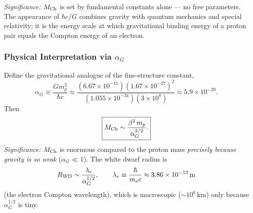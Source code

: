 \textit{Significance:} $M_{\rm Ch}$ is set by fundamental constants alone ---
no free parameters. The appearance of $\hbar c/G$ combines gravity with quantum
mechanics and special relativity; it is the energy scale at which gravitational
binding energy of a proton pair equals the Compton energy of an electron.

\subsubsection*{Physical Interpretation via $\alpha_G$}

Define the gravitational analogue of the fine-structure constant,
\begin{equation}
    \alpha_G \equiv \frac{Gm_p^2}{\hbar c}
    \approx \frac{(6.67\times10^{-11})(1.67\times10^{-27})^2}
                 {(1.055\times10^{-34})(3\times10^8)}
    \approx 5.9\times10^{-39}.
    \label{eq:lec10:alphaG}
\end{equation}
Then
\begin{equation}
    \boxed{
    M_{\rm Ch} \sim \frac{\beta^2\,m_p}{\alpha_G^{3/2}}.
    }
    \label{eq:lec10:Mch-alphaG}
\end{equation}
\textit{Significance:} $M_{\rm Ch}$ is enormous compared to the proton mass
\emph{precisely because gravity is so weak} ($\alpha_G \ll 1$). The white
dwarf radius is
\begin{equation}
    R_{\rm WD} \sim \frac{\lambda_e}{\alpha_G^{1/2}},
    \qquad
    \lambda_e \equiv \frac{\hbar}{m_e c} \approx 3.86\times10^{-13}\,\text{m}
    \label{eq:lec10:RWD}
\end{equation}
(the electron Compton wavelength), which is macroscopic ($\sim 10^{6}$\,km) only
because $\alpha_G^{1/2}$ is tiny.


